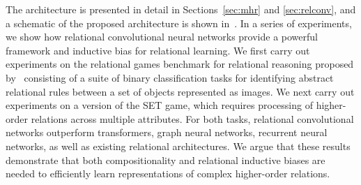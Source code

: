 The architecture is presented in detail in Sections~\ref{sec:mhr} and \ref{sec:relconv}, and a schematic of the proposed architecture is shown in~. 
In a series of experiments, we show how relational convolutional neural networks provide a powerful framework and inductive bias for relational learning. We first carry out experiments on the relational games benchmark for relational reasoning proposed by~\citep{shanahanExplicitlyRelationalNeural} consisting of a suite of binary classification tasks for identifying abstract relational rules between a set of objects represented as images. We next carry out experiments on a version of the SET game, which requires processing of higher-order relations across multiple attributes. For both tasks, relational convolutional networks outperform transformers, graph neural networks, recurrent neural networks, as well as existing relational architectures. We argue that these results demonstrate that both compositionality and relational inductive biases are needed to efficiently learn representations of complex higher-order relations.

